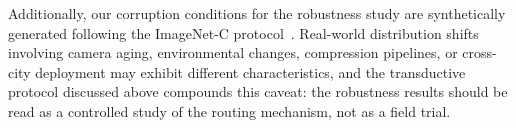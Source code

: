 Additionally, our corruption conditions for the robustness study are
synthetically generated following the ImageNet-C
protocol~\cite{hendrycks2019imagenetc}. Real-world distribution shifts
involving camera aging, environmental changes, compression pipelines, or
cross-city deployment may exhibit different characteristics, and the
transductive protocol discussed above compounds this caveat: the robustness
results should be read as a controlled study of the routing mechanism, not as
a field trial.

